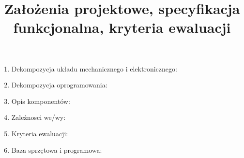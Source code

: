 \documentclass[a4paper]{article}
\title{Założenia projektowe, specyfikacja funkcjonalna, kryteria ewaluacji}
\date{}
\begin{document}
\maketitle

\begin{enumerate}

\item Dekompozycja układu mechanicznego i elektronicznego:

\item Dekompozycja oprogramowania:

\item Opis komponentów:

\item Zależnosci we/wy:

\item Kryteria ewaluacji:

\item Baza sprzętowa i programowa:

\end{enumerate}
\end{document}
